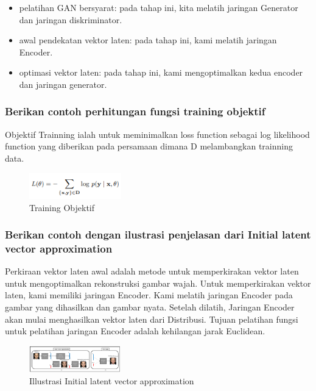	\begin{itemize} 
			\item pelatihan GAN bersyarat: pada tahap ini, kita melatih jaringan Generator dan jaringan diskriminator.
    		\item awal pendekatan vektor laten: pada tahap ini, kami melatih jaringan Encoder.
    		\item optimasi vektor laten: pada tahap ini, kami mengoptimalkan kedua encoder dan jaringan generator.
		\end{itemize}
		
\subsubsection{Berikan contoh perhitungan fungsi training objektif}
\hfill \break
Objektif Trainning ialah untuk meminimalkan loss function sebagai log likelihood function yang diberikan pada persamaan dimana D melambangkan trainning data.
	\begin{figure}[H]
		\includegraphics[width=4cm]{figures/1174066/9/10.png}
		\centering
		\caption{Training Objektif}
	\end{figure}

\subsubsection{Berikan contoh dengan ilustrasi penjelasan dari Initial latent vector approximation}
\hfill \break
Perkiraan vektor laten awal adalah metode untuk memperkirakan vektor laten untuk mengoptimalkan rekonstruksi gambar wajah. Untuk memperkirakan vektor laten, kami memiliki jaringan Encoder. Kami melatih jaringan Encoder pada gambar yang dihasilkan dan gambar nyata. Setelah dilatih, Jaringan Encoder akan mulai menghasilkan vektor laten dari Distribusi. Tujuan pelatihan fungsi untuk pelatihan jaringan Encoder adalah kehilangan jarak Euclidean.
	\begin{figure}[H]
		\includegraphics[width=4cm]{figures/1174066/9/8.png}
		\centering
		\caption{Illustrasi Initial latent vector approximation}
	\end{figure}

